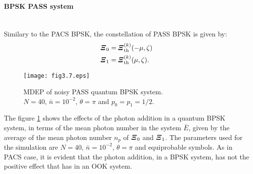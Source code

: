         \paragraph{BPSK PASS system}\mbox{}\\
        Similary to the PACS BPSK, the constellation of PASS BPSK is given by:
        \begin{equation}
            \begin{split}
                \Operator{\varXi}_0 &= \Operator{\varXi}_{\mathrm{th}}^{(k)}(-\mu,\zeta)\\
                \Operator{\varXi}_1 &= \Operator{\varXi}_{\mathrm{th}}^{(k)}(\mu,\zeta).
            \end{split}
        \end{equation}
        \begin{figure}[t]
            \begin{center}
                \texttt{[image: fig3.7.eps]}
                \caption{MDEP of noisy PASS quantum BPSK system.\\
                $N=40$, $\bar{n}=10^{-2}$, $\theta=\pi$ and $p_0=p_1=1/2$.}
                \label{fig:3.7}
            \end{center}
        \end{figure}
        The figure \ref{fig:3.7} shows the effects of the photon addition in a quantum BPSK
        system, in terms of the mean photon number in the system $\bar{E}$, given by the average of 
        the mean photon number $n_p$ of $\Operator{\varXi}_0$ and $\Operator{\varXi}_1$. The parameters used
        for the simulation are $N=40$, $\bar{n}=10^{-2}$, $\theta=\pi$ and equiprobable symbols.
        As in PACS case, it is evident that the photon addition, in a BPSK system, has not
        the positive effect that has in an OOK system.